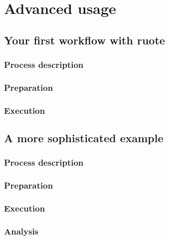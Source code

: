
\chapter{Advanced usage}



\section{Your first workflow with ruote}

    \subsection{Process description}

    \subsection{Preparation}

    \subsection{Execution}



\section{A more sophisticated example}

    \subsection{Process description}

    \subsection{Preparation}

    \subsection{Execution}

    \subsection{Analysis}
